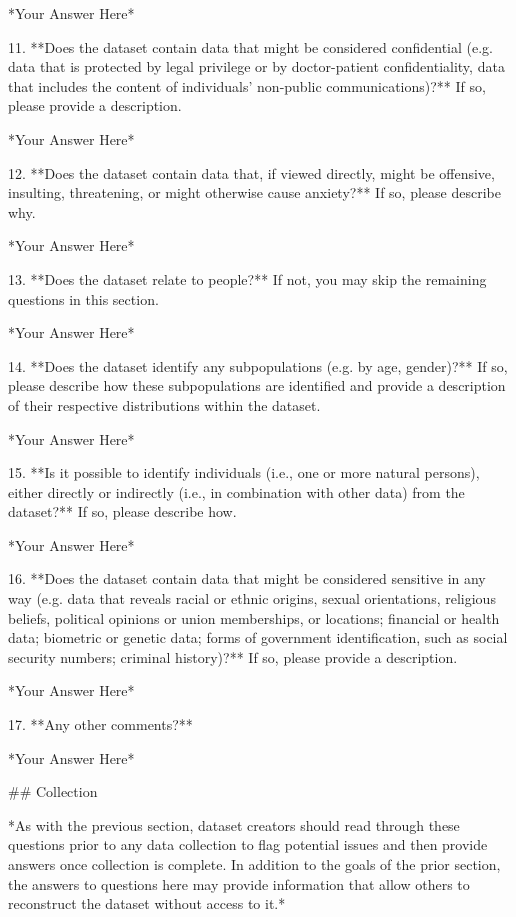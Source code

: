 	*Your Answer Here*

11. **Does the dataset contain data that might be considered confidential (e.g. data that is protected by legal privilege or by doctor-patient confidentiality, data that includes the content of individuals' non-public communications)?** If so, please provide a description.

	*Your Answer Here*

12. **Does the dataset contain data that, if viewed directly, might be offensive, insulting, threatening, or might otherwise cause anxiety?** If so, please describe why.

	*Your Answer Here*

13. **Does the dataset relate to people?** If not, you may skip the remaining questions in this section.

	*Your Answer Here*

14. **Does the dataset identify any subpopulations (e.g. by age, gender)?** If so, please describe how these subpopulations are identified and provide a description of their respective distributions within the dataset.

	*Your Answer Here*

15. **Is it possible to identify individuals (i.e., one or more natural persons), either directly or indirectly (i.e., in combination with other data) from the dataset?** If so, please describe how.

	*Your Answer Here*

16. **Does the dataset contain data that might be considered sensitive in any way (e.g. data that reveals racial or ethnic origins, sexual orientations, religious beliefs, political opinions or union memberships, or locations; financial or health data; biometric or genetic data; forms of government identification, such as social security numbers; criminal history)?** If so, please provide a description.

	*Your Answer Here*

17. **Any other comments?**

	*Your Answer Here*


## Collection

*As with the previous section, dataset creators should read through these questions prior to any data collection to flag potential issues and then provide answers once collection is complete. In addition to the goals of the prior section, the answers to questions here may provide information that allow others to reconstruct the dataset without access to it.*

